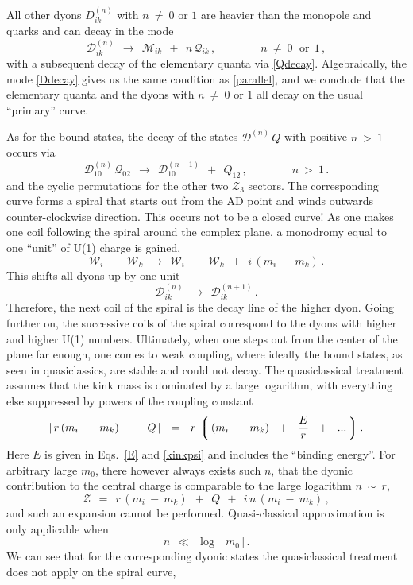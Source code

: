 \documentclass[epsfig,12pt]{article}
\def\beq{\begin{equation}}
\def\eeq{\end{equation}}
\def\beq{\begin{equation}}
\def\eeq{\end{equation}}
\newcommand{\mc}[1]{\mathcal{#1}}
\newcommand{\lgr}{\left\lgroup}
\newcommand{\rgr}{\right\rgroup}
\newcommand{\W}{\mathcal{W}}
\newcommand{\M}{\mathcal{M}}
\newcommand{\Q}{\mathcal{Q}}
\newcommand{\D}{\mathcal{D}}
\begin{document}
	All other dyons $ D_{ik}^{(n)} $ with $ n ~\neq~ 0 $ or $ 1 $ are heavier than the monopole and quarks and can decay in the mode
\beq
\label{Ddecay}
	\D_{ik}^{(n)}  ~~\longrightarrow~~ \M_{ik} ~~+~~ n\, \Q_{ik} \,, \qquad\qquad n ~\neq~ 0\, ~~\text{or}~~ 1\,,
\eeq
	with a subsequent decay of the elementary quanta via \eqref{Qdecay}.
	Algebraically, the mode \eqref{Ddecay} gives us the same condition as \eqref{parallel}, and 
	we conclude that the elementary quanta and the dyons with $ n ~\neq~ 0 $ or $ 1 $ all decay 
	on the usual ``primary'' curve.

	As for the bound states, the decay of the states $ \D^{(n)}\, Q $ with positive $ n ~>~ 1 $ occurs via
\beq
\label{spirpos}
	\D^{(n)}_{10}\, \Q_{02}  ~~\longrightarrow~~  \D^{(n-1)}_{10}  ~~+~~  Q_{12}\,,
	\qquad\qquad
	n ~>~ 1\,.
\eeq
	and the cyclic permutations for the other two $ \mc{Z}_3 $ sectors.
	The corresponding curve forms a spiral that starts out from the AD point and winds outwards counter-clockwise direction.
	This occurs not to be a closed curve!
	As one makes one coil following the spiral around the complex plane, a monodromy equal to one ``unit'' of U(1)
	charge is gained,
\beq
	\W_i  ~~-~~ \W_k  ~~\longrightarrow~~  \W_i  ~~-~~ \W_k  ~~+~~  i\, ( m_i ~-~ m_k )\,.
\eeq
	This shifts all dyons up by one unit 
\beq
	\D^{(n)}_{ik}  ~~\longrightarrow~~  \D^{(n+1)}_{ik}\,.
\eeq
	Therefore, the next coil of the spiral is the decay line of the higher dyon. 
	Going further on, the successive coils of the spiral correspond to the dyons with higher and higher U(1) numbers.
	Ultimately, when one steps out from the center of the plane far enough, one comes to weak coupling,
	where ideally the bound states, as seen in quasiclassics, are stable and could not decay.
	The quasiclassical treatment assumes that the kink mass is dominated by a large logarithm,
	with everything else suppressed by powers of the coupling constant
\beq
	|\, r\, ( m_i ~-~ m_k ) ~~+~~ Q \, |  ~~=~~  r \, \lgr\, ( m_i ~-~ m_k ) ~~+~~ \frac{ E }{r} ~~+~~ ... \,\rgr .
\eeq
	Here $ E $ is given in Eqs.~\eqref{E} and \eqref{kinkpsi} and includes the ``binding energy''.
	For arbitrary large $ m_0 $, there however always exists such $ n $, that the dyonic contribution to the central charge
	is comparable to the large logarithm $ n ~\sim~ r $, 
\beq
	\mc{Z} ~~=~~ r \, ( m_i ~-~ m_k ) ~~+~~ Q ~~+~~ i\, n\, ( m_i ~-~ m_k )\,,
\eeq
	and such an expansion cannot be performed.
	Quasi-classical approximation is only applicable when
\beq
	n  ~~\ll~~  \log\; |\, m_0 \,| \,.
\eeq
	We can see that for the corresponding dyonic states the quasiclassical treatment does not apply on the spiral curve, 
\end{document}
